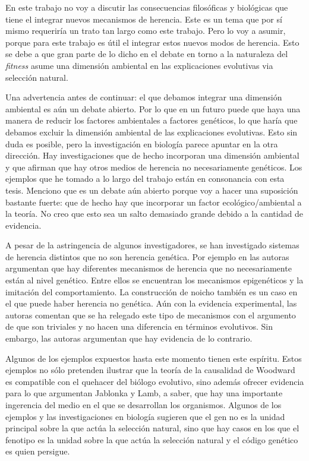 En este trabajo no voy a discutir las consecuencias filosóficas y biológicas que tiene el integrar nuevos mecanismos de herencia. Este es un tema que por sí mismo requeriría un trato tan largo como este trabajo. Pero lo voy a asumir, porque para este trabajo es útil el integrar estos nuevos modos de herencia. Esto se debe a que gran parte de lo dicho en el debate en torno a la naturaleza del \emph{fitness} asume una dimensión ambiental en las explicaciones evolutivas via selección natural.

Una advertencia antes de continuar: el que debamos integrar una dimensión ambiental es aún un debate abierto. Por lo que en un futuro puede que haya una manera de reducir los factores ambientales a factores genéticos, lo que haría que debamos excluir la dimensión ambiental de las explicaciones evolutivas. Esto sin duda es posible, pero la investigación en biología parece apuntar en la otra dirección. Hay investigaciones que de hecho incorporan una dimensión ambiental y que afirman que hay otros medios de herencia no necesariamente genéticos. Los ejemplos que he tomado a lo largo del trabajo están en consonancia con esta tesis. Menciono que es un debate aún abierto porque voy a hacer una suposición bastante fuerte: que de hecho hay que incorporar un factor ecológico/ambiental a la teoría. No creo que esto sea un salto demasiado grande debido a la cantidad de evidencia.

A pesar de la astringencia de algunos investigadores, se han investigado sistemas de herencia distintos que no son herencia genética. Por ejemplo en \cite{Jablonka2020} las autoras argumentan que hay diferentes mecanismos de herencia que no necesariamente están al nivel genético. Entre ellos se encuentran los mecanismos epigenéticos y la imitación del comportamiento. La construcción de noicho también es un caso en el que puede haber herencia no genética. Aún con la evidencia experimental, las autoras comentan que se ha relegado este tipo de mecanismos con el argumento de que son triviales y no hacen una diferencia en términos evolutivos. Sin embargo, las autoras argumentan que hay evidencia de lo contrario.

Algunos de los ejemplos expuestos hasta este momento tienen este espíritu. Estos ejemplos no sólo pretenden ilustrar que la teoría de la causalidad de Woodward es compatible con el quehacer del biólogo evolutivo, sino además ofrecer evidencia para lo que argumentan Jablonka y Lamb, a saber, que hay una importante ingerencia del medio en el que se desarrollan los organismos. Algunos de los ejemplos y las investigaciones en biología sugieren que el gen no es la unidad principal sobre la que actúa la selección natural, sino que hay casos en los que el fenotipo es la unidad sobre la que actúa la selección natural y el código genético es quien persigue.


